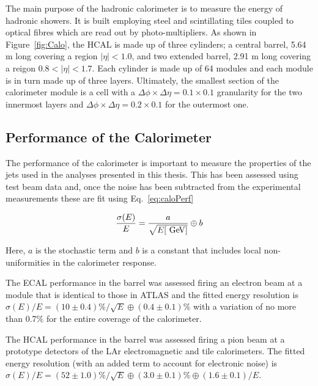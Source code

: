 				The main purpose of the hadronic calorimeter is to measure the energy of hadronic showers. It is built employing steel and scintillating tiles coupled to optical fibres which are read out by photo-multipliers. As shown in Figure~\ref{fig:Calo}, the \ac{HCAL} is made up of three cylinders; a central barrel, 5.64 m long covering a region $\left | \eta \right | < 1.0$, and two extended barrel, 2.91 m long covering a reigon $0.8 < \left | \eta \right | < 1.7$. Each cylinder is made up of 64 modules and each module is in turn made up of three layers. Ultimately, the smallest section of the calorimeter module is a cell with a $\Delta \phi \times \Delta \eta = 0.1 \times 0.1$ granularity for the two innermost layers and $\Delta \phi \times \Delta \eta = 0.2 \times 0.1$ for the outermost one. 

			\subsection*{Performance of the Calorimeter}

				The performance of the calorimeter is important to measure the properties of the jets used in the analyses presented in this thesis. This has been assessed using test beam data and, once the noise has been subtracted from the experimental measurements these are fit using Eq.~\ref{eq:caloPerf}

				\begin{equation}
				\label{eq:caloPerf}
					\frac{\sigma(E)}{E} = \frac{a}{\sqrt{E [ \GeV ] }} \oplus b
				\end{equation}

				\noindent Here, $a$ is the stochastic term and $b$ is a constant that includes local non-uniformities in the calorimeter response. 

				The \ac{ECAL} performance in the barrel was assessed firing an electron beam at a module that is identical to those in \ac{ATLAS} and the fitted energy resolution is $\sigma(E)/E = (10 \pm 0.4)\% / \sqrt{E} \oplus (0.4 \pm 0.1)\%$ with a variation of no more than 0.7\% for the entire coverage of the calorimeter.

				The \ac{HCAL} performance in the barrel was assessed firing a pion beam at a prototype detectors of the \ac{LAr} electromagnetic and tile calorimeters. The fitted energy resolution (with an added term to account for electronic noise) is $\sigma(E) / E = (52 \pm 1.0)\% / \sqrt{E} \oplus (3.0 \pm 0.1)\% \oplus (1.6 \pm 0.1) / E$. 


